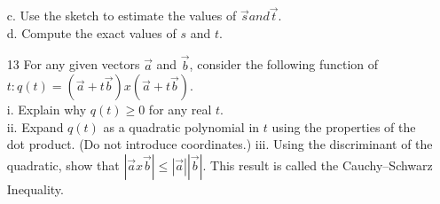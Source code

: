 \documentclass[a4paper]{article}
\begin{document}
\begin{itemize}
 c. Use the sketch to estimate the values of $\overrightarrow{s} and \overrightarrow{t}$. \\
 d. Compute the exact values of $s$ and $t$.
 \item[13] For any given vectors $\overrightarrow{a}$ and $\overrightarrow{b}$, consider the following function of $t: q(t) = (\overrightarrow{a} + t\overrightarrow{b}) x (\overrightarrow{a} + t\overrightarrow{b})$. \\
 i. Explain why $q(t) \geq 0$ for any real $t$. \\
 ii. Expand $q(t)$ as a quadratic polynomial in $t$ using the properties of the dot product. (Do not introduce coordinates.) 
 iii. Using the discriminant of the quadratic, show that $|\overrightarrow{a} x \overrightarrow{b}| \leq |\overrightarrow{a}||\overrightarrow{b}|$. This result is called the Cauchy–Schwarz Inequality.
 \end{itemize}

 

 
 
\end{document}
